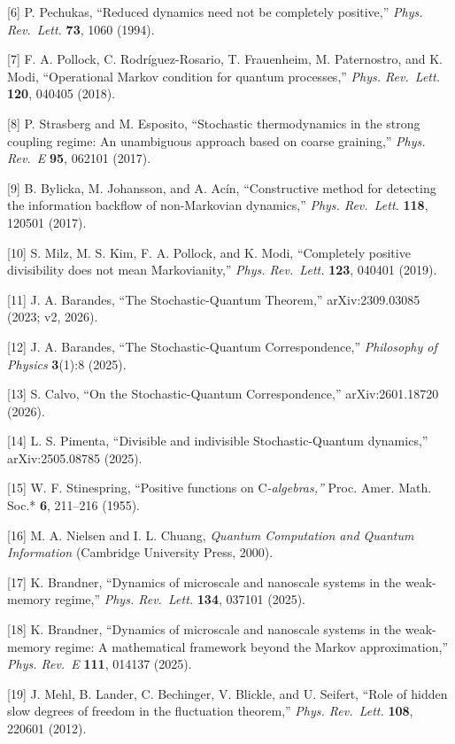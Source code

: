 \documentclass[
]{article}
\begin{document}
{[}6{]} P. Pechukas, ``Reduced dynamics need not be completely
positive,'' \emph{Phys. Rev.~Lett.} \textbf{73}, 1060 (1994).

{[}7{]} F. A. Pollock, C. Rodríguez-Rosario, T. Frauenheim, M.
Paternostro, and K. Modi, ``Operational Markov condition for quantum
processes,'' \emph{Phys. Rev.~Lett.} \textbf{120}, 040405 (2018).

{[}8{]} P. Strasberg and M. Esposito, ``Stochastic thermodynamics in the
strong coupling regime: An unambiguous approach based on coarse
graining,'' \emph{Phys. Rev.~E} \textbf{95}, 062101 (2017).

{[}9{]} B. Bylicka, M. Johansson, and A. Acín, ``Constructive method for
detecting the information backflow of non-Markovian dynamics,''
\emph{Phys. Rev.~Lett.} \textbf{118}, 120501 (2017).

{[}10{]} S. Milz, M. S. Kim, F. A. Pollock, and K. Modi, ``Completely
positive divisibility does not mean Markovianity,'' \emph{Phys.
Rev.~Lett.} \textbf{123}, 040401 (2019).

{[}11{]} J. A. Barandes, ``The Stochastic-Quantum Theorem,''
arXiv:2309.03085 (2023; v2, 2026).

{[}12{]} J. A. Barandes, ``The Stochastic-Quantum Correspondence,''
\emph{Philosophy of Physics} \textbf{3}(1):8 (2025).

{[}13{]} S. Calvo, ``On the Stochastic-Quantum Correspondence,''
arXiv:2601.18720 (2026).

{[}14{]} L. S. Pimenta, ``Divisible and indivisible Stochastic-Quantum
dynamics,'' arXiv:2505.08785 (2025).

{[}15{]} W. F. Stinespring, ``Positive functions on C\emph{-algebras,''
}Proc. Amer. Math. Soc.* \textbf{6}, 211--216 (1955).

{[}16{]} M. A. Nielsen and I. L. Chuang, \emph{Quantum Computation and
Quantum Information} (Cambridge University Press, 2000).

{[}17{]} K. Brandner, ``Dynamics of microscale and nanoscale systems in
the weak-memory regime,'' \emph{Phys. Rev.~Lett.} \textbf{134}, 037101
(2025).

{[}18{]} K. Brandner, ``Dynamics of microscale and nanoscale systems in
the weak-memory regime: A mathematical framework beyond the Markov
approximation,'' \emph{Phys. Rev.~E} \textbf{111}, 014137 (2025).

{[}19{]} J. Mehl, B. Lander, C. Bechinger, V. Blickle, and U. Seifert,
``Role of hidden slow degrees of freedom in the fluctuation theorem,''
\emph{Phys. Rev.~Lett.} \textbf{108}, 220601 (2012).
\end{document}
